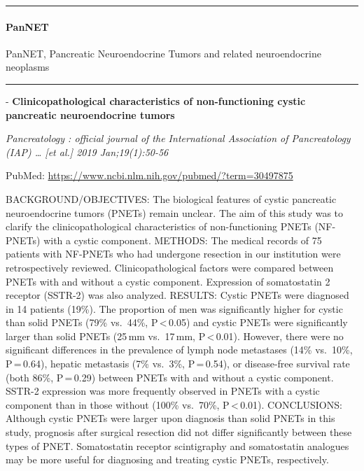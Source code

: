 \documentclass[]{article}
\let\oldparagraph\paragraph
\renewcommand{\paragraph}[1]{\oldparagraph{#1}\mbox{}}
\begin{document}
\begin{center}\rule{0.5\linewidth}{\linethickness}\end{center}

\hypertarget{pannet}{%
\paragraph{PanNET}\label{pannet}}

PanNET, Pancreatic Neuroendocrine Tumors and related neuroendocrine
neoplasms

\begin{center}\rule{0.5\linewidth}{\linethickness}\end{center}

 - \textbf{Clinicopathological characteristics of non-functioning cystic
pancreatic neuroendocrine tumors}

\emph{Pancreatology : official journal of the International Association
of Pancreatology (IAP) \ldots{} {[}et al.{]} 2019 Jan;19(1):50-56}

PubMed: \url{https://www.ncbi.nlm.nih.gov/pubmed/?term=30497875}

BACKGROUND/OBJECTIVES: The biological features of cystic pancreatic
neuroendocrine tumors (PNETs) remain unclear. The aim of this study was
to clarify the clinicopathological characteristics of non-functioning
PNETs (NF-PNETs) with a cystic component. METHODS: The medical records
of 75 patients with NF-PNETs who had undergone resection in our
institution were retrospectively reviewed. Clinicopathological factors
were compared between PNETs with and without a cystic component.
Expression of somatostatin 2 receptor (SSTR-2) was also analyzed.
RESULTS: Cystic PNETs were diagnosed in 14 patients (19\%). The
proportion of men was significantly higher for cystic than solid PNETs
(79\% vs.~44\%, P\,\textless{}\,0.05) and cystic PNETs were
significantly larger than solid PNETs (25\,mm vs.~17\,mm,
P\,\textless{}\,0.01). However, there were no significant differences in
the prevalence of lymph node metastases (14\% vs.~10\%, P\,=\,0.64),
hepatic metastasis (7\% vs.~3\%, P\,=\,0.54), or disease-free survival
rate (both 86\%, P\,=\,0.29) between PNETs with and without a cystic
component. SSTR-2 expression was more frequently observed in PNETs with
a cystic component than in those without (100\% vs.~70\%,
P\,\textless{}\,0.01). CONCLUSIONS: Although cystic PNETs were larger
upon diagnosis than solid PNETs in this study, prognosis after surgical
resection did not differ significantly between these types of PNET.
Somatostatin receptor scintigraphy and somatostatin analogues may be
more useful for diagnosing and treating cystic PNETs, respectively.
\end{document}
